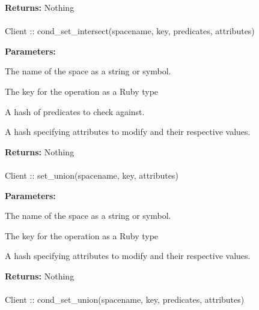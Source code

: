 \noindent\textbf{Returns:}
Nothing

\paragraph{}
\begin{ccode}
Client :: cond_set_intersect(spacename, key, predicates, attributes)
\end{ccode}
\funcdesc 

\noindent\textbf{Parameters:}
\begin{description}[labelindent=\widthof{{predicates}},leftmargin=*,noitemsep,nolistsep,align=right]
\item[spacename] The name of the space as a string or symbol.
\item[key] The key for the operation as a Ruby type
\item[predicates] A hash of predicates to check against.
\item[attributes] A hash specifying attributes to modify and their respective values.
\end{description}

\noindent\textbf{Returns:}
Nothing

\paragraph{}
\begin{ccode}
Client :: set_union(spacename, key, attributes)
\end{ccode}
\funcdesc 

\noindent\textbf{Parameters:}
\begin{description}[labelindent=\widthof{{attributes}},leftmargin=*,noitemsep,nolistsep,align=right]
\item[spacename] The name of the space as a string or symbol.
\item[key] The key for the operation as a Ruby type
\item[attributes] A hash specifying attributes to modify and their respective values.
\end{description}

\noindent\textbf{Returns:}
Nothing

\paragraph{}
\begin{ccode}
Client :: cond_set_union(spacename, key, predicates, attributes)
\end{ccode}
\funcdesc 

